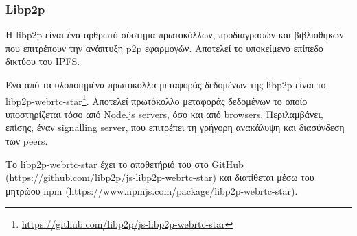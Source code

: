 \subsubsection{Libp2p} \label{subsection:4-2-4-3-libp2p}


Η libp2p είναι ένα αρθρωτό σύστημα πρωτοκόλλων, προδιαγραφών και βιβλιοθηκών που επιτρέπουν την ανάπτυξη p2p εφαρμογών. Αποτελεί το υποκείμενο επίπεδο δικτύου του IPFS.\cite{2.7-ipfs-docs}

Ένα από τα υλοποιημένα πρωτόκολλα μεταφοράς δεδομένων της libp2p είναι το libp2p-webrtc-star\footnote{\url{https://github.com/libp2p/js-libp2p-webrtc-star}}. Αποτελεί πρωτόκολλο μεταφοράς δεδομένων το οποίο υποστηρίζεται τόσο από Node.js servers, όσο και από browsers. Περιλαμβάνει, επίσης, έναν signalling server, που επιτρέπει τη γρήγορη ανακάλυψη και διασύνδεση των peers.

Το libp2p-webrtc-star έχει το αποθετήριό του στο GitHub (\url{https://github.com/libp2p/js-libp2p-webrtc-star}) και διατίθεται μέσω του μητρώου npm (\url{https://www.npmjs.com/package/libp2p-webrtc-star}).
